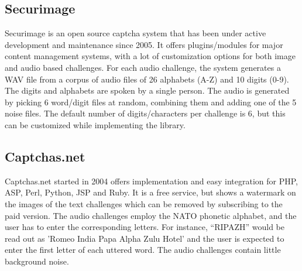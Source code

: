 \subsection{Securimage}

Securimage is an open source captcha system that has been under active development and maintenance 
since 2005. It offers plugins/modules for major content management systems, with a lot of customization 
options for both image and audio based challenges. For each audio challenge, the system generates a WAV 
file from a corpus of audio files of 26 alphabets (A-Z) and 10 digits (0-9). The digits and alphabets are 
spoken by a single person. The audio is generated by picking 6 word/digit files at random, combining them and adding one 
of the 5 noise files. The default number of digits/characters per challenge is 6, but this can 
be customized while implementing the library.

\subsection{Captchas.net}

Captchas.net started in 2004 offers implementation and easy integration for PHP, ASP, Perl, 
Python, JSP and Ruby. It is a free service, but shows a watermark on the images of the text challenges 
which can be removed by subscribing to the paid version. 
The audio challenges employ the NATO phonetic alphabet, and the user has to enter the corresponding letters.
For instance, ``RIPAZH'' would be read out as 'Romeo India Papa Alpha Zulu Hotel' and the user is expected 
to enter the first letter of each uttered word. The audio challenges contain little background noise.

%

